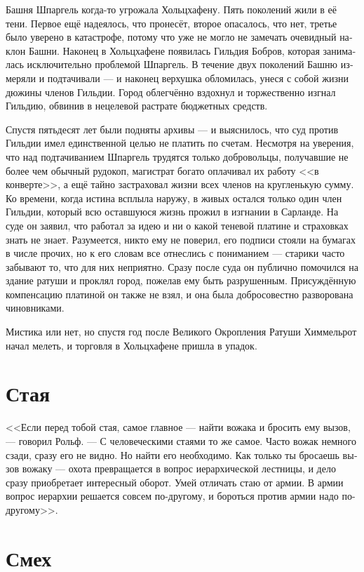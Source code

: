 \documentclass[a4paper,12pt,fleqn]{book}\usepackage{cooltooltips}\usepackage{polyglossia}\setdefaultlanguage[babelshorthands=true]{russian}\setotherlanguage{english}\defaultfontfeatures{Ligatures=TeX,Mapping=tex-text} \usepackage{xcolor}\definecolor{lightgray}{HTML}{bbbbbb}\color{lightgray}\newcommand{\ml}[3]{\textenglish{\textcolor{black}{#3}}}
\begin{document}
Башня Шпаргель когда-то угрожала Хольцхафену.
Пять поколений жили в её тени.
Первое ещё надеялось, что пронесёт, второе опасалось, что нет, третье было уверено в катастрофе, потому что уже не могло не замечать очевидный наклон Башни.
Наконец в Хольцхафене появилась Гильдия Бобров, которая занималась исключительно проблемой Шпаргель.
В течение двух поколений Башню измеряли и подтачивали --- и наконец верхушка обломилась, унеся с собой жизни дюжины членов Гильдии.
Город облегчённо вздохнул и торжественно изгнал Гильдию, обвинив в нецелевой растрате бюджетных средств.

Спустя пятьдесят лет были подняты архивы --- и выяснилось, что суд против Гильдии имел единственной целью не платить по счетам.
Несмотря на уверения, что над подтачиванием Шпаргель трудятся только добровольцы, получавшие не более чем обычный рудокоп, магистрат богато оплачивал их работу <<в конверте>>, а ещё тайно застраховал жизни всех членов на кругленькую сумму.
Ко времени, когда истина всплыла наружу, в живых остался только один член Гильдии, который всю оставшуюся жизнь прожил в изгнании в Сарланде.
На суде он заявил, что работал за идею и ни о какой теневой платине и страховках знать не знает.
Разумеется, никто ему не поверил, его подписи стояли на бумагах в числе прочих, но к его словам все отнеслись с пониманием --- старики часто забывают то, что для них неприятно.
Сразу после суда он публично помочился на здание ратуши и проклял город, пожелав ему быть разрушенным.
Присуждённую компенсацию платиной он также не взял, и она была добросовестно разворована чиновниками.

Мистика или нет, но спустя год после Великого Окропления Ратуши Химмельрот начал мелеть, и торговля в Хольцхафене пришла в упадок.

\section{Стая}

<<Если перед тобой стая, самое главное --- найти вожака и бросить ему вызов, --- говорил Рольф.
--- С человеческими стаями то же самое.
Часто вожак немного сзади, сразу его не видно.
Но найти его необходимо.
Как только ты бросаешь вызов вожаку --- охота превращается в вопрос иерархической лестницы, и дело сразу приобретает интересный оборот.
Умей отличать стаю от армии.
В армии вопрос иерархии решается совсем по-другому, и бороться против армии надо по-другому>>. 

\section{Смех}
\end{document}
